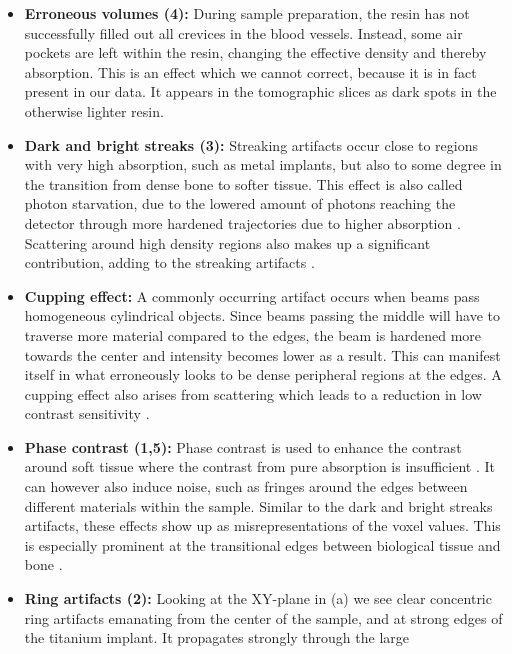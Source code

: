 \begin{itemize}
	\item \textbf{Erroneous volumes (4):} During sample preparation, the
		resin has not successfully filled out all crevices in the blood
		vessels. Instead, some air pockets are left within the resin,
		changing the effective density and thereby absorption. This is
		an effect which we cannot correct, because it is in fact
		present in our data. It appears in the tomographic slices
		 as dark spots in the otherwise lighter resin. 
	\item \textbf{Dark and bright streaks (3):} Streaking artifacts occur
		close to regions with very high absorption, such as metal
		implants, but also to some degree in the transition from dense
		bone to softer tissue.  This effect is also called photon
		starvation, due to the lowered amount of photons reaching the
		detector through more hardened trajectories due to higher
		absorption \cite{srnoise}. Scattering around high density
		regions also makes up a significant contribution, adding to the
		streaking artifacts \cite{scatter_sr_ct}.
	\item \textbf{Cupping effect:} A commonly occurring artifact occurs
		when beams pass homogeneous cylindrical objects. Since beams
		passing the middle will have to traverse more material compared
		to the edges, the beam is hardened more towards the center and
		intensity becomes lower as a result. This can manifest itself
		in what erroneously looks to be dense peripheral regions at the
		edges. A cupping effect also arises from scattering which leads
		to a reduction in low contrast sensitivity
		\cite{srnoise}.
	\item \textbf{Phase contrast (1,5):} Phase contrast is used to enhance
		the contrast around soft tissue where the contrast from pure
		absorption is insufficient \cite{phasecontrast}. It can
		however also induce noise, such as fringes around the edges
		between different materials within the sample\cite{srnoise}.
		Similar to the dark and bright streaks artifacts, these effects
		show up as misrepresentations of the voxel values. This is
		especially prominent at the transitional edges between
		biological tissue and bone \cite{srnoise}.
	\item \textbf{Ring artifacts (2):} Looking at the XY-plane in
		(a) we see clear concentric ring artifacts
		emanating from the center of the sample, and at strong edges of
		the titanium implant. It propagates strongly through the large

\end{itemize}
